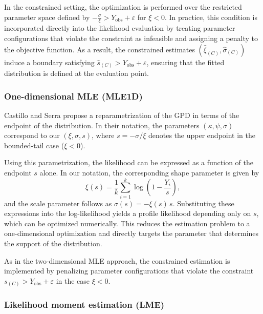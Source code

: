 In the constrained setting, the optimization is performed over the restricted parameter space defined by
$-\frac{\sigma}{\xi} > Y_{\mathrm{obs}}+\varepsilon$ for $\xi < 0$.
In practice, this condition is incorporated directly into the likelihood evaluation by treating parameter configurations that violate the constraint as infeasible and assigning a penalty to the objective function. As a result, the constrained estimates $(\hat{\xi}_{(C)}, \hat{\sigma}_{(C)})$ induce a boundary satisfying $\hat{s}_{(C)} > Y_{\mathrm{obs}}+\varepsilon$, ensuring that the fitted distribution is defined at the evaluation point.

\subsubsection*{One-dimensional MLE (MLE1D)}

Castillo and Serra \citep{castillo2015likelihood} propose a reparametrization of the GPD in terms of the endpoint of the distribution. 
In their notation, the parameters $(\kappa, \psi, \sigma)$ correspond to our $(\xi, \sigma, s)$, where $s = -\sigma/\xi$ denotes the upper endpoint in the bounded-tail case ($\xi < 0$). 

Using this parametrization, the likelihood can be expressed as a function of the endpoint $s$ alone. 
In our notation, the corresponding shape parameter is given by
\begin{equation}
\xi(s) = \frac{1}{k} \sum_{i=1}^k \log\left(1 - \frac{Y_i}{s}\right),
\end{equation}
and the scale parameter follows as $\sigma(s) = -\xi(s)\,s$. 
Substituting these expressions into the log-likelihood yields a profile likelihood depending only on $s$, which can be optimized numerically. 
This reduces the estimation problem to a one-dimensional optimization and directly targets the parameter that determines the support of the distribution.

As in the two-dimensional MLE approach, the constrained estimation is implemented by penalizing parameter configurations that violate the constraint $s_{(C)} > Y_{\mathrm{obs}} + \varepsilon$ in the case $\xi < 0$. 

\subsubsection*{Likelihood moment estimation (LME)}

